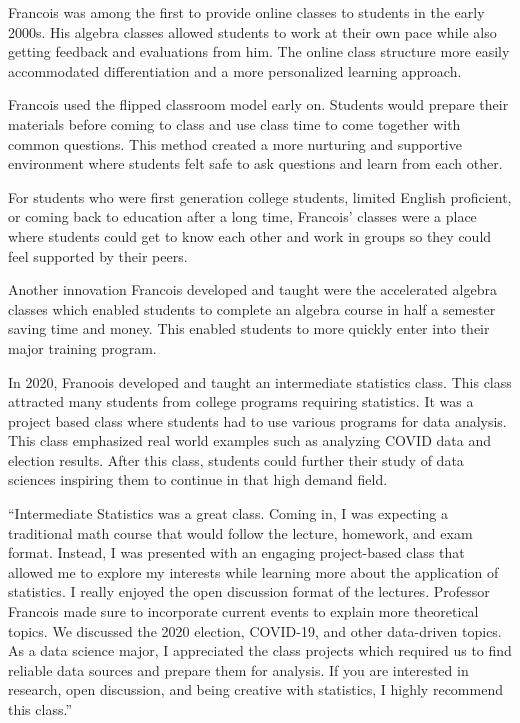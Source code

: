 \documentclass[
]{book}
\begin{document}
Francois was among the first to provide online classes to students in the early 2000s. His algebra classes allowed students to work at their own pace while also getting feedback and evaluations from him. The online class structure more easily accommodated differentiation and a more personalized learning approach.

Francois used the flipped classroom model early on. Students would prepare their materials before coming to class and use class time to come together with common questions. This method created a more nurturing and supportive environment where students felt safe to ask questions and learn from each other.

For students who were first generation college students, limited English proficient, or coming back to education after a long time, Francois' classes were a place where students could get to know each other and work in groups so they could feel supported by their peers.

Another innovation Francois developed and taught were the accelerated algebra classes which enabled students to complete an algebra course in half a semester saving time and money. This enabled students to more quickly enter into their major training program.

In 2020, Franoois developed and taught an intermediate statistics class. This class attracted many students from college programs requiring statistics. It was a project based class where students had to use various programs for data analysis. This class emphasized real world examples such as analyzing COVID data and election results. After this class, students could further their study of data sciences inspiring them to continue in that high demand field.

``Intermediate Statistics was a great class. Coming in, I was expecting a traditional math course that would follow the lecture, homework, and exam format. Instead, I was presented with an engaging project-based class that allowed me to explore my interests while learning more about the application of statistics. I really enjoyed the open discussion format of the lectures. Professor Francois made sure to incorporate current events to explain more theoretical topics. We discussed the 2020 election, COVID-19, and other data-driven topics. As a data science major, I appreciated the class projects which required us to find reliable data sources and prepare them for analysis. If you are interested in research, open discussion, and being creative with statistics, I highly recommend this class.''
\end{document}

